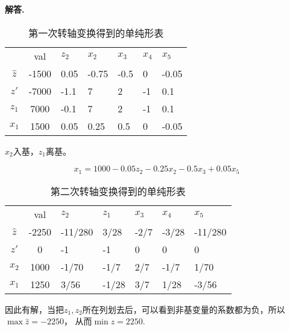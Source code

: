 \documentclass[12pt, a4paper, oneside]{ctexart}
\newenvironment{solution}{\par\noindent\textbf{解答. }}{\\\par}
\begin{document}
\begin{solution}
    \begin{table}[!h]
        \centering
        \begin{tabular}{cclllll}
                      & val      & $z_2$ & $x_2$ & $x_3$ & $x_4$ & $x_5$ \\
            $\hat{z}$ &-1500     &0.05   &-0.75  &-0.5   & 0     &-0.05  \\
            $z'$      &-7000     &-1.1   &    7  &   2   & -1    &0.1    \\
            $z_1$     &7000      &-0.1   & 7     & 2     & -1    &0.1    \\
            $x_1$     &1500      &0.05   & 0.25  & 0.5   & 0     &-0.05  \\
        \end{tabular}
        \caption{第一次转轴变换得到的单纯形表}
    \end{table}

    $x_2$入基，$z_1$离基。

    \[x_1=1000-0.05z_2-0.25x_2-0.5x_3+0.05x_5\]

    \begin{table}[!h]
        \centering
        \begin{tabular}{cclllll}
                      & val      & $z_2$ & $z_1$ & $x_3$ & $x_4$ & $x_5$ \\
            $\hat{z}$ &-2250     &-11/280&3/28   &-2/7   &-3/28  &-11/280\\
            $z'$      &0         &    -1 &-1     &0      &0      &0      \\
            $x_2$     &1000      &-1/70  &-1/7   &2/7    &-1/7   &1/70   \\
            $x_1$     &1250      &3/56   &-1/28  &3/7    &1/28   &-3/56   \\
        \end{tabular}
        \caption{第二次转轴变换得到的单纯形表}
    \end{table}

    因此有解，当把$z_1,z_2$所在列划去后，可以看到非基变量的系数都为负，所以$\max\hat{z}=-2250$，
    从而$\min z=2250.$
\end{solution}
\end{document}
